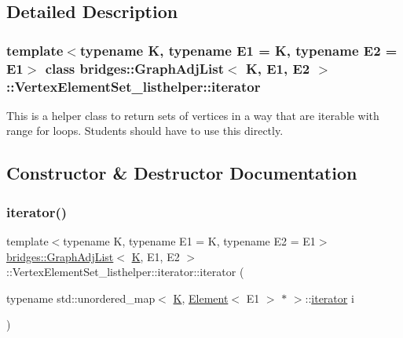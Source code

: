 \subsection{Detailed Description}
\subsubsection*{template$<$typename K, typename E1 = K, typename E2 = E1$>$\newline
class bridges\+::\+Graph\+Adj\+List$<$ K, E1, E2 $>$\+::\+Vertex\+Element\+Set\+\_\+listhelper\+::iterator}

This is a helper class to return sets of vertices in a way that are iterable with range for loops. Students should have to use this directly. 

\subsection{Constructor \& Destructor Documentation}
\mbox{\label{classbridges_1_1_graph_adj_list_1_1_vertex_element_set__listhelper_1_1iterator_a73bc4be2fe2dc6edb80bc9bae4ac3581}} 
\subsubsection{\texorpdfstring{iterator()}{iterator()}}
{\footnotesize\ttfamily template$<$typename K, typename E1 = K, typename E2 = E1$>$ \\
\hyperlink{classbridges_1_1_graph_adj_list}{bridges\+::\+Graph\+Adj\+List}$<$ \hyperlink{namespacebridges_acfb0a4f7877d8f63de3e6862004c50edaa5f3c6a11b03839d46af9fb43c97c188}{K}, E1, E2 $>$\+::Vertex\+Element\+Set\+\_\+listhelper\+::iterator\+::iterator (\begin{DoxyParamCaption}\item[{typename std\+::unordered\+\_\+map$<$ \hyperlink{namespacebridges_acfb0a4f7877d8f63de3e6862004c50edaa5f3c6a11b03839d46af9fb43c97c188}{K}, \hyperlink{classbridges_1_1_element}{Element}$<$ E1 $>$ $\ast$ $>$\+::\hyperlink{classbridges_1_1_graph_adj_list_1_1_vertex_element_set__listhelper_1_1iterator}{iterator}}]{i }\end{DoxyParamCaption})\hspace{0.3cm}{\ttfamily [inline]}}



